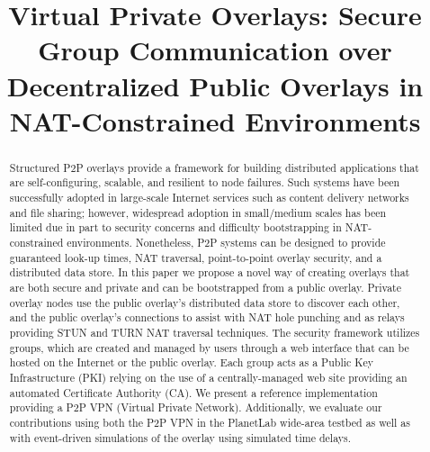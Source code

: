 \documentclass[conference]{IEEEtran}
\begin{document}
\title{Virtual Private Overlays: Secure Group Communication over Decentralized
Public Overlays in NAT-Constrained Environments}

\author{ 
}

\maketitle

\begin{abstract}
Structured P2P overlays provide a framework for building distributed applications that
are self-configuring, scalable, and resilient to node failures.  Such systems
have been successfully adopted in large-scale Internet services such as content
delivery networks and file sharing; however, widespread adoption in small/medium
scales has been limited due in part to security concerns and difficulty
bootstrapping in NAT-constrained environments.  Nonetheless, P2P systems can be designed to
provide guaranteed look-up times, NAT traversal, point-to-point overlay
security, and a distributed data store. In this paper we propose
a novel way of creating overlays that are both secure and
private and can be bootstrapped from a public overlay.
Private overlay nodes use the public overlay's distributed data store to discover
each other, and the public overlay's connections to assist with NAT hole punching
and as relays providing STUN and TURN NAT traversal techniques.  The security
framework utilizes groups, which are created and managed by users through
a web interface that can be hosted on the Internet or the public overlay.
Each group acts as a Public Key Infrastructure (PKI) relying on
the use of a centrally-managed web site providing an automated Certificate
Authority (CA).  We present a reference implementation providing a P2P VPN
(Virtual Private Network).  Additionally, we evaluate our contributions using
both the P2P VPN in the PlanetLab wide-area testbed as well as with event-driven
simulations of the overlay using simulated time delays.
\end{abstract}
\end{document}
